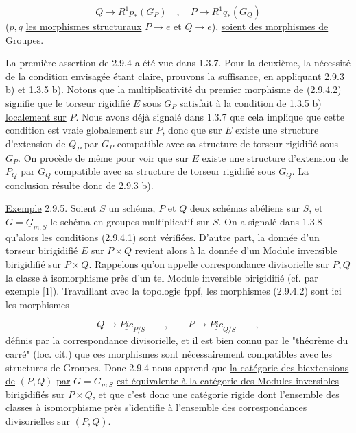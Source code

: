 \begin{equation}\tag{2.9.4.2}
Q \longrightarrow R^1 p_*(G_P) \quad , \quad P \longrightarrow R^1 q_*(G_Q)
\end{equation}
($p,q$ \underline{les morphismes structuraux} $P \to e$ et $Q \to e$), \underline{soient des morphismes de Groupes}.

La première assertion de 2.9.4 a été vue dans 1.3.7. Pour la deuxième, la nécessité de la condition envisagée étant claire, prouvons
la suffisance, en appliquant 2.9.3 b) et 1.3.5 b). Notons que la multiplicativité du premier morphisme de (2.9.4.2) signifie que le torseur rigidifié $E$ sous $G_P$ satisfait à la condition de 1.3.5 b) \underline{localement sur} $P$. Nous avons déjà signalé dans 1.3.7 que cela implique que cette condition est vraie globalement sur $P$, donc que sur $E$ existe une structure d'extension de $Q_P$ par $G_P$ compatible avec sa structure de torseur rigidifié sous $G_P$. On procède de même pour voir que sur $E$ existe une structure d'extension de $P_Q$ par $G_Q$ compatible avec sa structure de torseur rigidifié sous $G_Q$. La conclusion résulte donc de 2.9.3 b).

\underline{Exemple} 2.9.5. Soient $S$ un schéma, $P$ et $Q$ deux schémas abéliens sur $S$, et $G=\underline{G}_{m,S}$ le schéma en groupes multiplicatif sur $S$. On a signalé dans 1.3.8 qu'alors les conditions (2.9.4.1) sont vérifiées. D'autre part, la donnée d'un torseur birigidifié $E$ sur $P\times Q$ revient alors à la donnée d'un Module inversible birigidifié sur $P\times Q$. Rappelons qu'on appelle \underline{correspondance divisorielle sur} $P,Q$ la classe à isomorphisme près d'un tel Module inversible birigidifié (cf. par exemple [1]). Travaillant avec la topologie fppf, les morphismes (2.9.4.2) sont ici les morphismes

\begin{equation}\tag{2.9.5.1}
Q \longrightarrow \underline{Pic}_{P/S} \qquad , \qquad P \longrightarrow \underline{Pic}_{Q/S} \qquad ,
\end{equation}
définis par la correspondance divisorielle, et il est bien connu par le "théorème du carré" (loc. cit.) que ces morphismes sont nécessairement compatibles avec les structures de Groupes. Donc 2.9.4 nous apprend que \underline{la catégorie des biextensions de} $(P,Q)$ \underline{par} $G=G_{m\ S}$ \underline{est équivalente à la catégorie des Modules inversibles birigidifiés sur} $P\times Q$, et que c'est donc une catégorie rigide dont l'ensemble des classes à isomorphisme près s'identifie à l'ensemble des correspondances divisorielles sur $(P,Q)$.


